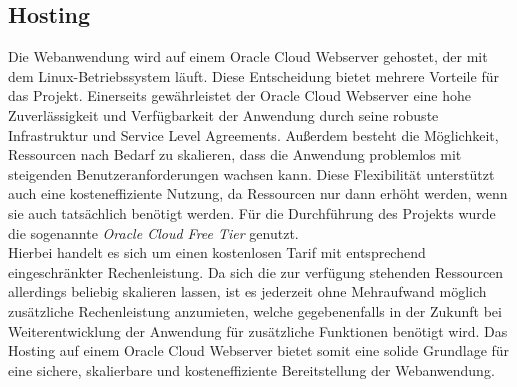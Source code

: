 \documentclass[conference]{IEEEtran}
\begin{document}
\subsection{Hosting}
Die Webanwendung wird auf einem Oracle Cloud Webserver gehostet, der mit dem Linux-Betriebssystem läuft. Diese Entscheidung bietet mehrere Vorteile für das Projekt. Einerseits gewährleistet der Oracle Cloud Webserver eine hohe Zuverlässigkeit und Verfügbarkeit der Anwendung durch seine robuste Infrastruktur und Service Level Agreements. Außerdem besteht die Möglichkeit, Ressourcen nach Bedarf zu skalieren, dass die Anwendung problemlos mit steigenden Benutzeranforderungen wachsen kann. Diese Flexibilität unterstützt auch eine kosteneffiziente Nutzung, da Ressourcen nur dann erhöht werden, wenn sie auch tatsächlich benötigt werden. Für die Durchführung des Projekts wurde die sogenannte \textit{Oracle Cloud Free Tier} genutzt. \\
Hierbei handelt es sich um einen kostenlosen Tarif mit entsprechend eingeschränkter Rechenleistung. Da sich die zur verfügung stehenden Ressourcen allerdings beliebig skalieren lassen, ist es jederzeit ohne Mehraufwand möglich zusätzliche Rechenleistung anzumieten, welche gegebenenfalls in der Zukunft bei Weiterentwicklung der Anwendung für zusätzliche Funktionen benötigt wird. Das Hosting auf einem Oracle Cloud Webserver bietet somit eine solide Grundlage für eine sichere, skalierbare und kosteneffiziente Bereitstellung der Webanwendung. \\
\end{document}
